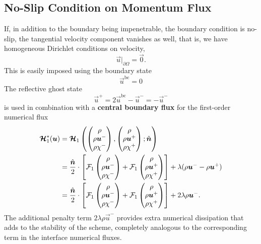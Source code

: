 \documentclass{report}
\numberwithin{equation}{section}
\begin{document}
\subsection{No-Slip Condition on Momentum Flux}

If, in addition to the boundary being impenetrable, the boundary condition is no-slip, the tangential velocity component vanishes as well, that is, we have homogeneous Dirichlet conditions on velocity,
\begin{equation}
    \vec u \bigg|_{\partial \Omega} = \vec 0.
\end{equation}
This is easily imposed using the boundary state
\begin{equation}
    \vec u^{\text{bc}} = 0
\end{equation}
The reflective ghost state
\begin{equation}
    \vec u^+ = 2 \vec u^{\text{bc}} - \vec u^- = - \vec u^-
\end{equation}
is used in combination with a \textbf{central boundary flux} for the first-order numerical flux
\begin{align}
    \boldsymbol{{\mathcal{H}}}_1^*(\boldsymbol{{u}}) & = \boldsymbol{{\mathcal{H}}}_1 \left(
        \begin{pmatrix} \rho \\ \rho \boldsymbol{{u}}^- \\ \rho \chi^- \end{pmatrix}, 
        \begin{pmatrix} \rho \\ \rho \boldsymbol{{u}}^+ \\ \rho \chi^+ \end{pmatrix}; 
    \hat{\boldsymbol{{n}} } \right) \nonumber \\
    & = \frac{\hat{\boldsymbol{{n}} }}{2} \cdot \left[
        \mathcal{F}_1 \begin{pmatrix} \rho \\ \rho \boldsymbol{{u}}^- \\ \rho \chi^- \end{pmatrix} 
        + \mathcal{F}_1 \begin{pmatrix} \rho \\ \rho \boldsymbol{{u}}^+ \\ \rho \chi^+ \end{pmatrix} 
    \right] + \lambda (\rho \boldsymbol{{u}}^- - \rho \boldsymbol{{u}}^+) \nonumber \\
    & = \frac{\hat{\boldsymbol{{n}} }}{2} \cdot \left[
        \mathcal{F}_1 \begin{pmatrix} \rho \\ \rho \boldsymbol{{u}}^- \\ \rho \chi^- \end{pmatrix} 
        + \mathcal{F}_1 \begin{pmatrix} \rho \\ \rho \boldsymbol{{u}}^+ \\ \rho \chi^+ \end{pmatrix} 
    \right] + 2 \lambda \rho \boldsymbol{{u}}^-.
\end{align}
The additional penalty term $2 \lambda \rho \vec u^-$ provides extra numerical dissipation that adds to the stability of the scheme, completely analogous to the corresponding term in the interface numerical fluxes.
\end{document}

